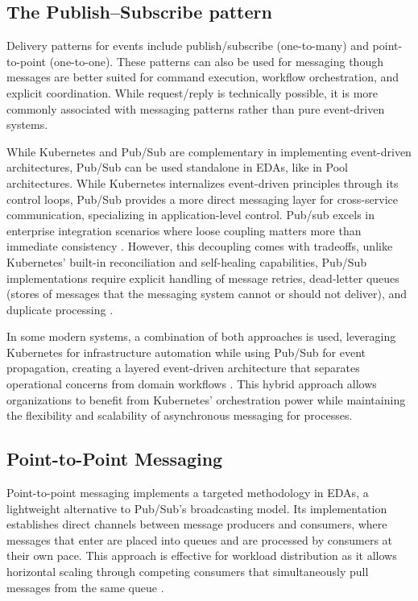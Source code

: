 \documentclass[]{final}
\begin{document}
\subsection{The Publish–Subscribe pattern}

Delivery patterns for events include publish/subscribe (one-to-many) and
point-to-point (one-to-one). These patterns can also be used for messaging
though messages are better suited for command execution, workflow
orchestration, and explicit coordination. While request/reply is technically
possible, it is more commonly associated with messaging patterns rather than
pure event-driven systems.

While Kubernetes and Pub/Sub are complementary in implementing event-driven
architectures, Pub/Sub can be used standalone in EDAs, like in Pool
architectures. While Kubernetes internalizes event-driven principles through
its control loops, Pub/Sub provides a more direct messaging layer for
cross-service communication, specializing in application-level control.
Pub/sub excels in enterprise integration scenarios where loose coupling
matters more than immediate consistency \cite{noauthor_what_pubsub}. However, this decoupling comes
with tradeoffs, unlike Kubernetes' built-in reconciliation and self-healing
capabilities, Pub/Sub implementations require explicit handling of message
retries, dead-letter queues (stores of messages that the messaging system
cannot or should not deliver), and duplicate processing \cite{noauthor_what_pubsub}.

In some modern systems, a combination of both approaches is used, leveraging
Kubernetes for infrastructure automation while using Pub/Sub for event
propagation, creating a layered event-driven architecture that separates
operational concerns from domain workflows \cite{noauthor_what_pubsub}. This hybrid approach allows
organizations to benefit from Kubernetes' orchestration power while
maintaining the flexibility and scalability of asynchronous messaging for
processes.


\subsection{Point-to-Point Messaging}

Point-to-point messaging implements a targeted methodology in EDAs, a
lightweight alternative to Pub/Sub's broadcasting model. Its implementation
establishes direct channels between message producers and consumers, where
messages that enter are placed into queues and are processed by consumers at
their own pace. This approach is effective for workload distribution as it
allows horizontal scaling through competing consumers that simultaneously
pull messages from the same queue \cite{noauthor_point--point_nodate}.
\end{document}
